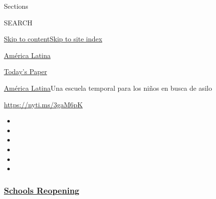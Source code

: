 Sections

SEARCH

\protect\hyperlink{site-content}{Skip to
content}\protect\hyperlink{site-index}{Skip to site index}

\href{https://www.nytimes3xbfgragh.onion/es/section/america-latina}{América
Latina}

\href{https://myaccount.nytimes3xbfgragh.onion/auth/login?response_type=cookie\&client_id=vi}{}

\href{https://www.nytimes3xbfgragh.onion/section/todayspaper}{Today's
Paper}

\href{/es/section/america-latina}{América Latina}\textbar{}Una escuela
temporal para los niños en busca de asilo

\url{https://nyti.ms/3gaM6pK}

\begin{itemize}
\item
\item
\item
\item
\item
\item
\end{itemize}

\hypertarget{schools-reopening}{%
\subsubsection{\texorpdfstring{\href{https://www.nytimes3xbfgragh.onion/spotlight/schools-reopening?name=styln-coronavirus-schools-reopening\&region=TOP_BANNER\&variant=undefined\&block=storyline_menu_recirc\&action=click\&pgtype=Article\&impression_id=6c72b100-e386-11ea-ba56-c354277706d3}{Schools
Reopening}}{Schools Reopening}}\label{schools-reopening}}

